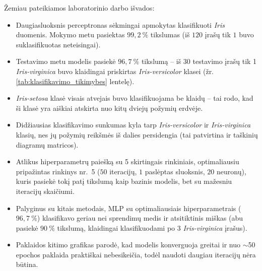 \label{sec:isvados}

Žemiau pateikiamos laboratorinio darbo išvados:
\begin{itemize}
    \item Daugiasluoksnis perceptronas sėkmingai apmokytas klasifikuoti \textit{Iris} duomenis. Mokymo metu pasiektas $99{,}2\ \%$ tikslumas (iš $120$ įrašų tik $1$ buvo suklasifikuotas neteisingai).
    \item Testavimo metu modelis pasiekė $96{,}7\ \%$ tikslumą – iš 30 testavimo įrašų tik 1 \textit{Iris-virginica} buvo klaidingai priskirtas \textit{Iris-versicolor} klasei (žr. \ref{tab:klasifikavimo_tikimybes} lentelę).
    \item \textit{Iris-setosa} klasė visais atvejais buvo klasifikuojama be klaidų – tai rodo, kad ši klasė yra aiškiai atskirta nuo kitų dviejų požymių erdvėje.
    \item Didžiausias klasifikavimo sunkumas kyla tarp \textit{Iris-versicolor} ir \textit{Iris-virginica} klasių, nes jų požymių reikšmės iš dalies persidengia (tai patvirtina ir taškinių diagramų matricos).
    \item Atlikus hiperparametrų paiešką su 5 skirtingais rinkiniais, optimaliausiu pripažintas rinkinys nr.~5 ($50$ iteracijų, $1$ paslėptas sluoksnis, $20$ neuronų), kuris pasiekė tokį patį tikslumą kaip bazinis modelis, bet su mažesniu iteracijų skaičiumi.
    \item Palyginus su kitais metodais, MLP su optimaliausiais hiperparametrais ($96{,}7\ \%$) klasifikavo geriau nei sprendimų medis ir atsitiktinis miškas (abu pasiekė $90\ \%$ tikslumą, klaidingai klasifikuodami po 3 \textit{Iris-virginica} įrašus).
    \item Paklaidos kitimo grafikas parodė, kad modelis konverguoja greitai ir nuo $\sim$50 epochos paklaida praktiškai nebesikeičia, todėl naudoti daugiau iteracijų nėra būtina.
\end{itemize}